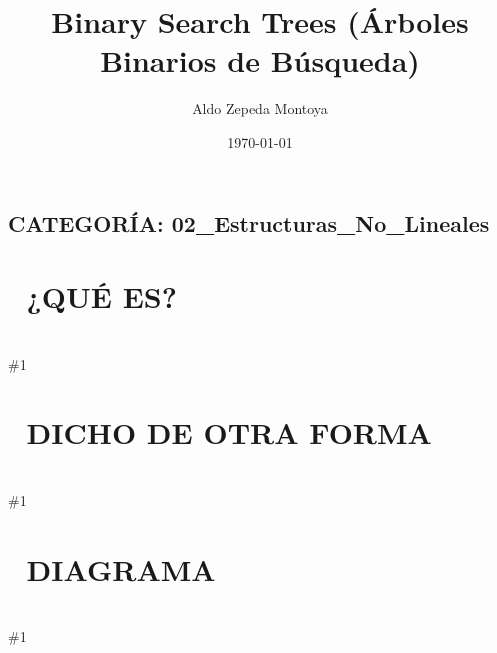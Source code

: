 \documentclass{article}
\newcommand{\quees}[1]{
    \section*{🤔 ¿QUÉ ES?}
    \hrulefill \\
    \#1
}
\newcommand{\dichodeotraforma}[1]{
    \section*{💬 DICHO DE OTRA FORMA}
    \hrulefill \\
    \#1
}
\newcommand{\diagrama}[1]{
    \section*{🎨 DIAGRAMA}
    \hrulefill \\
    \#1
}
\begin{document}
\title{Binary Search Trees (Árboles Binarios de Búsqueda)}
\author{Aldo Zepeda Montoya}
\date{\today}
\maketitle

\subsection*{CATEGORÍA: 02\_Estructuras\_No\_Lineales}

\quees{
Un árbol genealógico 🌳 de cabeza. La raíz (root) está hasta arriba.
Cada persona (nodo) puede tener máximo dos hijos.

Pero es un árbol inteligente con una regla de oro:
- Todo lo que está a la IZQUIERDA de un nodo es MENOR.
- Todo lo que está a la DERECHA de un nodo es MAYOR.

Es como una biblioteca 📚 donde los libros están tan bien ordenados
que puedes encontrar cualquiera en segundos, sin revisar todos los 
estantes.
}

\dichodeotraforma{
Un Binary Search Tree (BST) es una estructura de datos no lineal
formada por nodos. Cada nodo contiene un valor y punteros a sus hijos
izquierdo y derecho.

La propiedad de orden (izq < raíz < der) permite que las operaciones
de búsqueda, inserción y eliminación se realicen en tiempo 
logarítmico O(log n), siempre y cuando el árbol esté balanceado.
}

\diagrama{\begin{verbatim}
BST de ejemplo:

         [8]          ← ROOT
       /     \
    [3]       [10]
   /   \         \
 [1]    [6]       [14]
       /   \      /
     [4]   [7]  [13]

- Leaf Nodes (hojas): 1, 4, 7, 13 (no tienen hijos).
- Height (altura): 3 (niveles desde la raíz).
\end{verbatim}}
\end{document}
